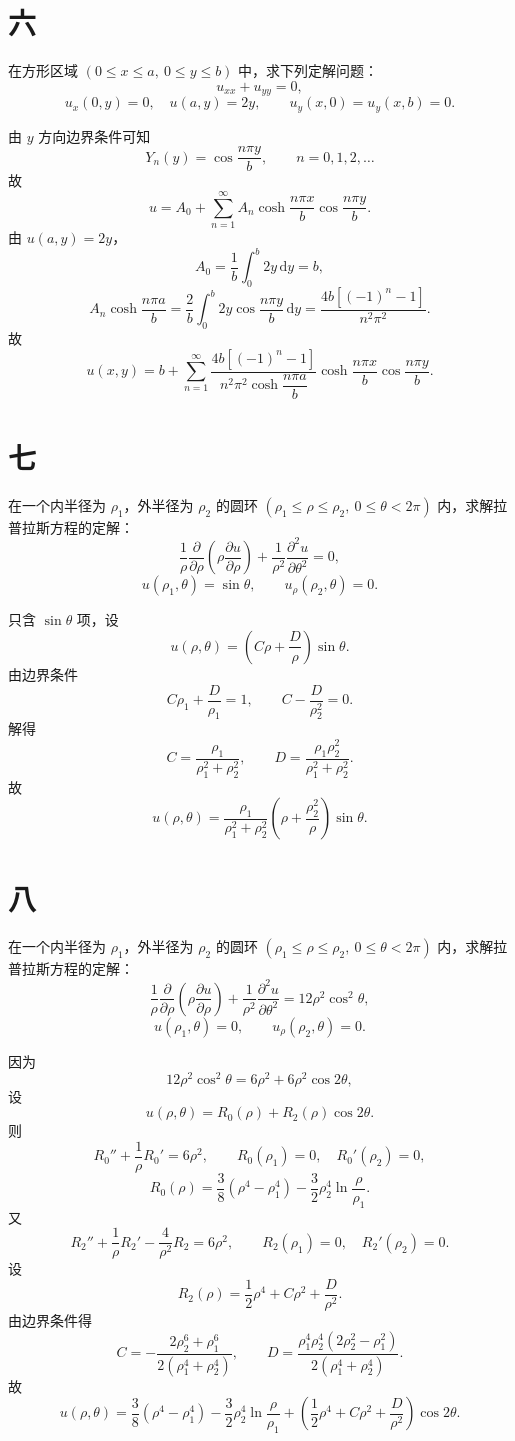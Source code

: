 \documentclass[UTF8,zihao=-4]{ctexart}
\begin{document}
\section*{六}

在方形区域 $(0\le x\le a,\ 0\le y\le b)$ 中，求下列定解问题：
\[
u_{xx}+u_{yy}=0,
\]
\[
u_x(0,y)=0,\quad u(a,y)=2y,\qquad
u_y(x,0)=u_y(x,b)=0.
\]

由 $y$ 方向边界条件可知
\[
Y_n(y)=\cos\dfrac{n\pi y}{b},\qquad n=0,1,2,\dots
\]
故
\[
u=A_0+\sum_{n=1}^{\infty}A_n\cosh\dfrac{n\pi x}{b}\cos\dfrac{n\pi y}{b}.
\]
由 $u(a,y)=2y$，
\[
A_0=\dfrac1b\int_0^b2y\,\mathrm{d}y=b,
\]
\[
A_n\cosh\dfrac{n\pi a}{b}
=\dfrac{2}{b}\int_0^b2y\cos\dfrac{n\pi y}{b}\,\mathrm{d}y
=\dfrac{4b\left[(-1)^n-1\right]}{n^2\pi^2}.
\]
故
\[
u(x,y)=b+\sum_{n=1}^{\infty}
\dfrac{4b\left[(-1)^n-1\right]}{n^2\pi^2\cosh\dfrac{n\pi a}{b}}
\cosh\dfrac{n\pi x}{b}\cos\dfrac{n\pi y}{b}.
\]

\section*{七}

在一个内半径为 $\rho_1$，外半径为 $\rho_2$ 的圆环
$(\rho_1\le\rho\le\rho_2,\ 0\le\theta<2\pi)$ 内，求解拉普拉斯方程的定解：
\[
\dfrac1\rho\dfrac{\partial}{\partial\rho}\left(\rho\dfrac{\partial u}{\partial\rho}\right)
+\dfrac1{\rho^2}\dfrac{\partial^2u}{\partial\theta^2}=0,
\]
\[
u(\rho_1,\theta)=\sin\theta,\qquad u_\rho(\rho_2,\theta)=0.
\]

只含 $\sin\theta$ 项，设
\[
u(\rho,\theta)=\left(C\rho+\dfrac{D}{\rho}\right)\sin\theta.
\]
由边界条件
\[
C\rho_1+\dfrac{D}{\rho_1}=1,\qquad
C-\dfrac{D}{\rho_2^2}=0.
\]
解得
\[
C=\dfrac{\rho_1}{\rho_1^2+\rho_2^2},\qquad
D=\dfrac{\rho_1\rho_2^2}{\rho_1^2+\rho_2^2}.
\]
故
\[
u(\rho,\theta)=
\dfrac{\rho_1}{\rho_1^2+\rho_2^2}
\left(\rho+\dfrac{\rho_2^2}{\rho}\right)\sin\theta.
\]

\section*{八}

在一个内半径为 $\rho_1$，外半径为 $\rho_2$ 的圆环
$(\rho_1\le\rho\le\rho_2,\ 0\le\theta<2\pi)$ 内，求解拉普拉斯方程的定解：
\[
\dfrac1\rho\dfrac{\partial}{\partial\rho}\left(\rho\dfrac{\partial u}{\partial\rho}\right)
+\dfrac1{\rho^2}\dfrac{\partial^2u}{\partial\theta^2}
=12\rho^2\cos^2\theta,
\]
\[
u(\rho_1,\theta)=0,\qquad u_\rho(\rho_2,\theta)=0.
\]

因为
\[
12\rho^2\cos^2\theta=6\rho^2+6\rho^2\cos2\theta,
\]
设
\[
u(\rho,\theta)=R_0(\rho)+R_2(\rho)\cos2\theta.
\]
则
\[
R_0''+\dfrac1\rho R_0'=6\rho^2,\qquad
R_0(\rho_1)=0,\quad R_0'(\rho_2)=0,
\]
\[
R_0(\rho)=\dfrac38(\rho^4-\rho_1^4)-\dfrac32\rho_2^4\ln\dfrac{\rho}{\rho_1}.
\]
又
\[
R_2''+\dfrac1\rho R_2'-\dfrac4{\rho^2}R_2=6\rho^2,
\qquad R_2(\rho_1)=0,\quad R_2'(\rho_2)=0.
\]
设
\[
R_2(\rho)=\dfrac12\rho^4+C\rho^2+\dfrac{D}{\rho^2}.
\]
由边界条件得
\[
C=-\dfrac{2\rho_2^6+\rho_1^6}{2(\rho_1^4+\rho_2^4)},\qquad
D=\dfrac{\rho_1^4\rho_2^4(2\rho_2^2-\rho_1^2)}
{2(\rho_1^4+\rho_2^4)}.
\]
故
\[
u(\rho,\theta)=
\dfrac38(\rho^4-\rho_1^4)-\dfrac32\rho_2^4\ln\dfrac{\rho}{\rho_1}
+\left(\dfrac12\rho^4+C\rho^2+\dfrac{D}{\rho^2}\right)\cos2\theta.
\]
\end{document}
